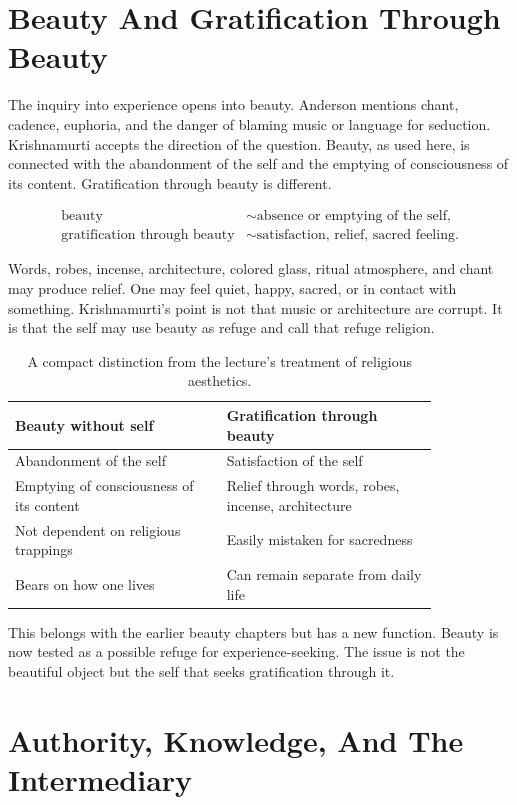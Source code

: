 \documentclass[11pt,oneside]{book}
\begin{document}
\section{Beauty And Gratification Through Beauty}

The inquiry into experience opens into beauty. Anderson mentions chant, cadence, euphoria, and the danger of blaming music or language for seduction. Krishnamurti accepts the direction of the question. Beauty, as used here, is connected with the abandonment of the self and the emptying of consciousness of its content. Gratification through beauty is different.

\begin{align}
\text{beauty}
&\sim
\text{absence or emptying of the self},\\
\text{gratification through beauty}
&\sim
\text{satisfaction, relief, sacred feeling}.
\end{align}

Words, robes, incense, architecture, colored glass, ritual atmosphere, and chant may produce relief. One may feel quiet, happy, sacred, or in contact with something. Krishnamurti's point is not that music or architecture are corrupt. It is that the self may use beauty as refuge and call that refuge religion.

\begin{table}
\centering
\begin{tabular}{p{0.42\linewidth}p{0.42\linewidth}}
\hline
\textbf{Beauty without self} & \textbf{Gratification through beauty} \\
\hline
Abandonment of the self & Satisfaction of the self \\
Emptying of consciousness of its content & Relief through words, robes, incense, architecture \\
Not dependent on religious trappings & Easily mistaken for sacredness \\
Bears on how one lives & Can remain separate from daily life \\
\hline
\end{tabular}
\caption{A compact distinction from the lecture's treatment of religious aesthetics.}
\end{table}

This belongs with the earlier beauty chapters but has a new function. Beauty is now tested as a possible refuge for experience-seeking. The issue is not the beautiful object but the self that seeks gratification through it.

\section{Authority, Knowledge, And The Intermediary}
\end{document}
